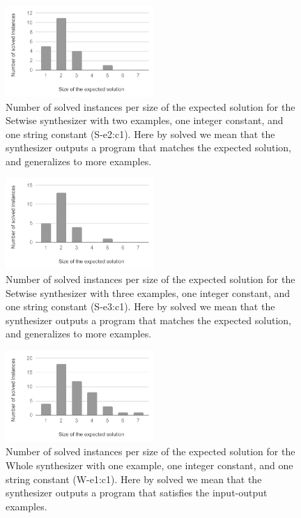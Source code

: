 \begin{figure}
  \centering
  \includegraphics[width=0.5\textwidth]{assets/bar-chart-expected-S-e2-c1.pdf}
  \caption{Number of solved instances per size of the expected solution for
    the Setwise synthesizer with two examples, one integer constant, and one
    string constant (S-e2:c1). Here by solved we mean that the synthesizer
    outputs a program that matches the expected solution, and generalizes to
    more examples.}
  \label{fig:bar-chart-expected-S-e2-c1}
\end{figure}

\begin{figure}
  \centering
  \includegraphics[width=0.5\textwidth]{assets/bar-chart-expected-S-e3-c1.pdf}
  \caption{Number of solved instances per size of the expected solution for
    the Setwise synthesizer with three examples, one integer constant, and one
    string constant (S-e3:c1). Here by solved we mean that the synthesizer
    outputs a program that matches the expected solution, and generalizes to
    more examples.}
  \label{fig:bar-chart-expected-S-e3-c1}
\end{figure}

\begin{figure}
  \centering
  \includegraphics[width=0.5\textwidth]{assets/bar-chart-solved-W-e1-c1.pdf}
  \caption{Number of solved instances per size of the expected solution for
    the Whole synthesizer with one example, one integer constant, and one
    string constant (W-e1:c1). Here by solved we mean that the synthesizer
    outputs a program that satisfies the input-output examples.}
  \label{fig:bar-chart-solved-W-e1-c1}
\end{figure}

